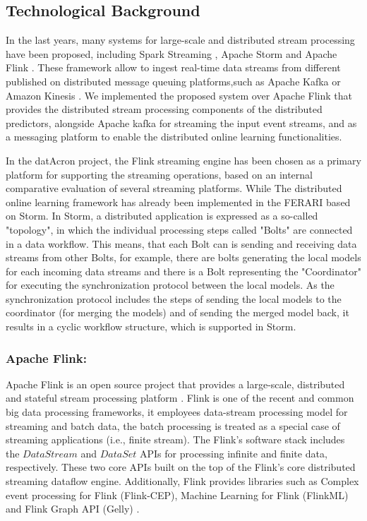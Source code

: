 \subsection{Technological Background}
In the last years, many systems for large-scale and distributed stream processing have been proposed, including Spark Streaming \cite{Spark},  Apache Storm \cite{Storm} and Apache Flink \cite{Flink}. These framework allow to ingest real-time data streams from different published on distributed message queuing platforms,such as Apache Kafka \cite{Kafka} or  Amazon Kinesis \cite{Kinesis}. We implemented the proposed system over Apache Flink that provides the distributed stream processing components of the distributed predictors, alongside  Apache kafka for streaming the input event streams, and as a messaging platform to enable the distributed online learning functionalities.


\par In the datAcron project, the Flink streaming engine has been chosen as a primary platform for supporting the streaming operations, based on an internal comparative evaluation of several streaming platforms. While The distributed online learning framework has already been implemented in the FERARI \cite{flouris2016ferari}  based on Storm. In Storm, a distributed application is expressed as a so-called "topology", in which the individual processing steps called "Bolts" are connected
in a data workflow. This means, that each Bolt can is sending and receiving data streams from other Bolts, for example, there are bolts generating
the local models for each incoming data streams and there is a Bolt representing the "Coordinator" for executing the synchronization protocol between
the local models. As the synchronization protocol includes the steps of sending the local models to the coordinator (for merging the models) and of sending
the merged model back, it results in a cyclic workflow structure, which is supported in Storm. 

\subsubsection*{Apache Flink:\\}

\par Apache Flink is an open source project that provides a large-scale, distributed and stateful stream processing platform \cite{carbone2015apache}. Flink is one of the recent and common big data processing frameworks, it employees data-stream processing model for streaming and batch data, the batch processing is treated as a special case of streaming applications (i.e., finite stream). The Flink's software stack includes the  $DataStream$ and $DataSet$ APIs for processing infinite and finite data, respectively. These two core APIs built on the top of the Flink's core distributed streaming dataflow engine. Additionally, Flink provides libraries such as Complex event processing for Flink (Flink-CEP), Machine Learning for Flink (FlinkML) and Flink Graph API (Gelly) \cite{carbone2015apache}.

